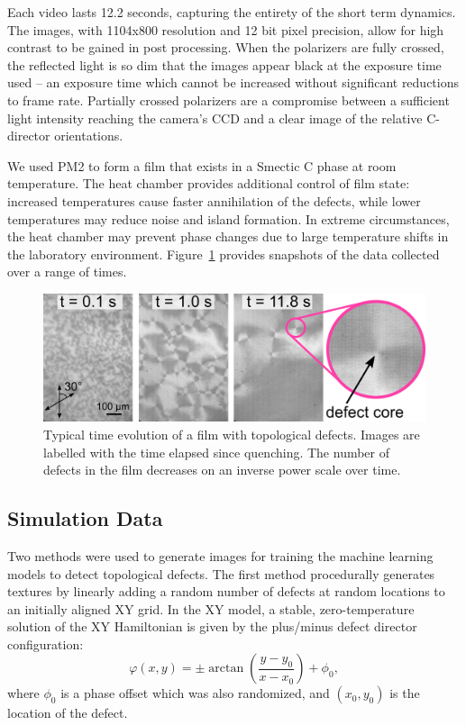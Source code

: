 \documentclass[prl,reprint,showpacs,floatfix,nofootinbib]{revtex4-1}
\begin{document}
Each video lasts 12.2 seconds, capturing the entirety of the short term dynamics. The images, with 1104x800 resolution and 12 bit pixel precision, allow for high contrast to be gained in post processing. When the polarizers are fully crossed, the reflected light is so dim that the images appear black at the exposure time used -- an exposure time which cannot be increased without significant reductions to frame rate. Partially crossed polarizers are a compromise between a sufficient light intensity reaching the camera's CCD and a clear image of the relative C-director orientations.

We used PM2 \cite{harth_episodes_2016} to form a film that exists in a Smectic C phase at room temperature. The heat chamber provides additional control of film state: increased temperatures cause faster annihilation of the defects, while lower temperatures may reduce noise and island formation. In extreme circumstances, the heat chamber may prevent phase changes due to large temperature shifts in the laboratory environment. Figure~\ref{fig:frames} provides snapshots of the data collected over a range of times.

\begin{figure}[h!]
  \includegraphics[width=\linewidth]{qM.png}
  \caption{Typical time evolution of a film with topological defects. Images are labelled with the time elapsed since quenching. The number of defects in the film decreases on an inverse power scale over time.}
  \label{fig:frames}
\end{figure}

\subsection{Simulation Data}

Two methods were used to generate images for training the machine learning models to detect topological defects. 
The first method procedurally generates textures by linearly adding a random number of defects at random locations to an initially aligned XY grid. In the XY model, a stable, zero-temperature solution of the XY Hamiltonian is given by the plus/minus defect director configuration:
\begin{equation}
\varphi(x,y) = \pm \arctan{\left(\frac{y-y_0}{x-x_0}\right)} + \phi_0, 
\end{equation}
where $\phi_0$ is a phase offset which was also randomized, and $(x_0,y_0)$ is the location of the defect.
\end{document}
